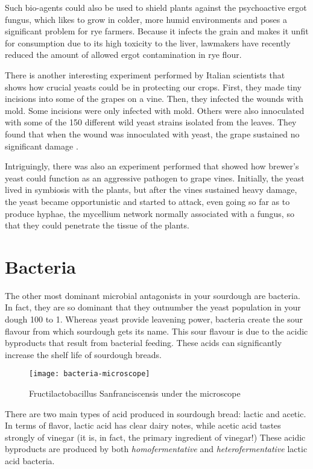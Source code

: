 Such bio-agents could also be used to shield plants against the psychoactive
ergot fungus, which likes to grow in colder, more humid environments and
poses a significant problem for rye farmers. Because it infects the grain
and makes it unfit for consumption due to its high toxicity to the liver,
lawmakers have recently reduced the amount of allowed ergot contamination in
rye flour.

There is another interesting experiment performed by Italian scientists that
shows how crucial yeasts could be in protecting our crops. First, they made
tiny incisions into some of the grapes on a vine. Then, they infected the
wounds with mold. Some incisions were only infected with mold. Others were also
innoculated with some of the 150 different wild yeast strains isolated from the
leaves. They found that when the wound was innoculated with yeast, the grape
sustained no significant damage \cite{yeasts+biocontrol+agent}.

Intriguingly, there was also an experiment performed that showed how brewer's
yeast could function as an aggressive pathogen to grape vines. Initially, the
yeast lived in symbiosis with the plants, but after the vines sustained heavy
damage, the yeast became opportunistic and started to attack, even going so far
as to produce hyphae, the mycellium network normally associated with a fungus,
so that they could penetrate the tissue of the plants.

\section{Bacteria}

The other most dominant microbial antagonists in your sourdough are bacteria.
In fact, they are so dominant that they outnumber the yeast population in your
dough 100 to 1. Whereas yeast provide leavening power, bacteria create the sour
flavour from which sourdough gets its name. This sour flavour is due to the
acidic byproducts that result from bacterial feeding. These acids can
significantly increase the shelf life of sourdough breads.
\cite{shelflife+acidity}

\begin{figure}
  \texttt{[image: bacteria-microscope]}
  \caption{Fructilactobacillus Sanfranciscensis under the microscope}
  \label{lactobacillus-franciscensis-microscope}
\end{figure}

There are two main types of acid produced in sourdough bread: lactic and acetic.
In terms of flavor, lactic acid has clear dairy notes, while acetic acid tastes
strongly of vinegar (it is, in fact, the primary ingredient of vinegar!) These
acidic byproducts are produced by both \emph{homofermentative} and
\emph{heterofermentative} lactic acid bacteria.

